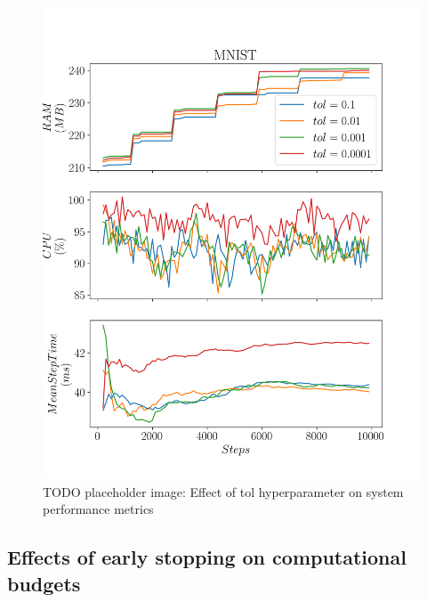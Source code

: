 \begin{figure}[h]
    \includegraphics[width=12cm]{assets/tol.png}
    \caption{TODO placeholder image: Effect of tol hyperparameter on system performance metrics}
    \label{figure:tol}
\end{figure}

\subsection{Effects of early stopping on computational budgets}




